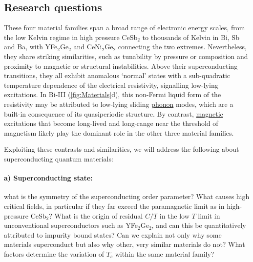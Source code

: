 \subsection*{Research questions}
\noindent
These four material families span a broad range of electronic energy scales, from the low Kelvin regime in high pressure CeSb$_2$ to thousands of Kelvin in Bi, Sb and Ba, with YFe$_2$Ge$_2$ %
and CeNi$_2$Ge$_2$  %
connecting the two extremes. Nevertheless, they share striking similarities, such as tunability by pressure or composition and proximity to magnetic or structural instabilities. 
Above their superconducting transitions, they all exhibit anomalous `normal' states with a sub-quadratic temperature dependence of the electrical resistivity, signalling low-lying excitations. In Bi-III (\autoref{fig:Materials}d), this non-Fermi liquid form of the resistivity may be attributed to low-lying sliding \ul{phonon} modes, which are a built-in consequence of its quasiperiodic structure. %
By contrast, \ul{magnetic} excitations that become long-lived and long-range near the threshold of magnetism likely play the dominant role in the other three material families. 

Exploiting these contrasts and similarities, we will address the following   about superconducting quantum materials:

\paragraph {a) Superconducting state:} what is the symmetry of the superconducting order parameter? What causes high critical fields, in particular if they far exceed the paramagnetic limit as in high-pressure CeSb$_2$? What is the origin of residual $C/T$ in the low $T$ limit in unconventional superconductors such as YFe$_2$Ge$_2$, and can this be quantitatively attributed to impurity bound states? 
Can we explain not only why some materials superconduct but also why other, very similar materials do not? What factors determine the variation of $T_c$ within the same material family? 


